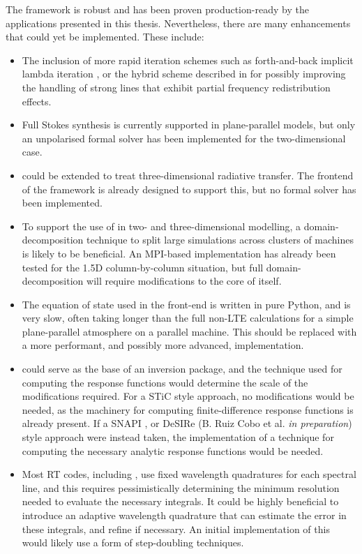The \Lw{} framework is robust and has been proven production-ready by the applications presented in this thesis.
Nevertheless, there are many enhancements that could yet be implemented.
These include:
\begin{itemize}
	\item The inclusion of more rapid iteration schemes such as forth-and-back implicit lambda iteration \citep{AtanackovicVukmanovic1997,Kuzmanovska2017}, or the hybrid scheme described in \citet{Avrett2008} for possibly improving the handling of strong lines that exhibit partial frequency redistribution effects.
	\item Full Stokes synthesis is currently supported in plane-parallel models, but only an unpolarised formal solver has been implemented for the two-dimensional case.
	\item \Lw{} could be extended to treat three-dimensional radiative transfer. The frontend of the framework is already designed to support this, but no formal solver has been implemented.
	\item To support the use of \Lw{} in two- and three-dimensional modelling, a domain-decomposition technique to split large simulations across clusters of machines is likely to be beneficial. An MPI-based implementation has already been tested for the 1.5D column-by-column situation, but full domain-decomposition will require modifications to the core of \Lw{} itself.
	\item The equation of state used in the front-end is written in pure Python, and is very slow, often taking longer than the full non-LTE calculations for a simple plane-parallel atmosphere on a parallel machine. This should be replaced with a more performant, and possibly more advanced, implementation.
	\item \Lw{} could serve as the base of an inversion package, and the technique used for computing the response functions would determine the scale of the modifications required. For a STiC \citep{2019dlcr} style approach, no modifications would be needed, as the machinery for computing finite-difference response functions is already present. If a SNAPI \citep{Milic2018}, or DeSIRe (B. Ruiz Cobo et al. \emph{in preparation}) style approach were instead taken, the implementation of a technique for computing the necessary analytic response functions would be needed.
	\item Most RT codes, including \Lw{}, use fixed wavelength quadratures for each spectral line, and this requires pessimistically determining the minimum resolution needed to evaluate the necessary integrals. It could be highly beneficial to introduce an adaptive wavelength quadrature that can estimate the error in these integrals, and refine if necessary. An initial implementation of this would likely use a form of step-doubling techniques.

\end{itemize}
